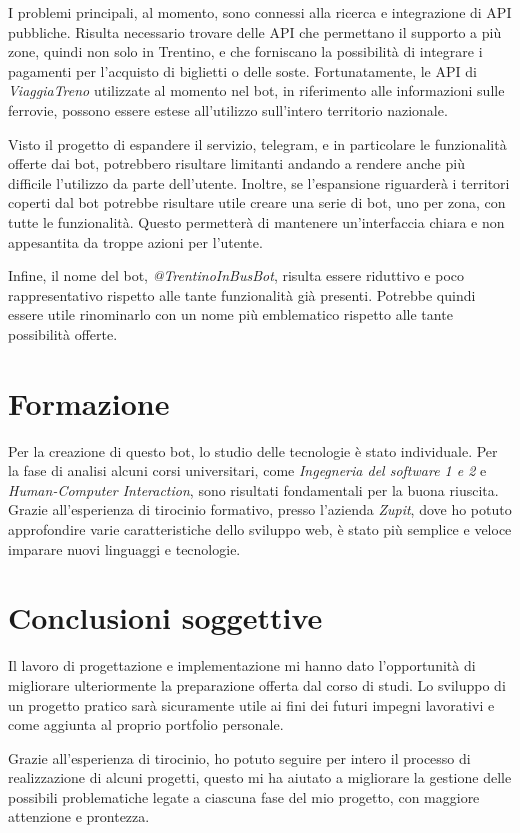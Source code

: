 I problemi principali, al momento, sono connessi alla ricerca e integrazione di API pubbliche. Risulta necessario trovare delle API che permettano il supporto a più zone, quindi non solo in Trentino, e che forniscano la possibilità di integrare i pagamenti per l'acquisto di biglietti o delle soste. Fortunatamente, le API di \textit{ViaggiaTreno} utilizzate al momento nel bot, in riferimento alle informazioni sulle ferrovie, possono essere estese all'utilizzo sull'intero territorio nazionale. 

Visto il progetto di espandere il servizio, telegram, e in particolare le funzionalità offerte dai bot, potrebbero risultare limitanti andando a rendere anche più difficile l'utilizzo da parte dell'utente. Inoltre, se l'espansione riguarderà i territori coperti dal bot potrebbe risultare utile creare una serie di bot, uno per zona, con tutte le funzionalità. Questo permetterà di mantenere un'interfaccia chiara e non appesantita da troppe azioni per l'utente. 

Infine, il nome del bot, \textit{@TrentinoInBusBot}, risulta essere riduttivo e poco rappresentativo rispetto alle tante funzionalità già presenti. Potrebbe quindi essere utile rinominarlo con un nome più emblematico rispetto alle tante possibilità offerte. 

\section{Formazione}

Per la creazione di questo bot, lo studio delle tecnologie è stato individuale. Per la fase di analisi alcuni corsi universitari, come \textit{Ingegneria del software 1 e 2} e \textit{Human-Computer Interaction}, sono risultati fondamentali per la buona riuscita. 
Grazie all'esperienza di tirocinio formativo,  presso l'azienda \textit{Zupit}, dove ho potuto approfondire varie caratteristiche dello sviluppo web, è stato più semplice e veloce imparare nuovi linguaggi e tecnologie.

\section{Conclusioni soggettive}

Il lavoro di progettazione e implementazione mi hanno dato l'opportunità di migliorare ulteriormente la preparazione offerta dal corso di studi. Lo sviluppo di un progetto pratico sarà sicuramente utile ai fini dei futuri impegni lavorativi e come aggiunta al proprio portfolio personale. 

Grazie all'esperienza di tirocinio, ho potuto seguire per intero il processo di realizzazione di alcuni progetti, questo mi ha aiutato a migliorare la gestione delle possibili problematiche legate a ciascuna fase del mio progetto, con maggiore attenzione e prontezza. 